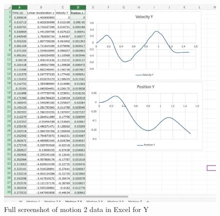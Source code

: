 \documentclass[idxtotoc,hyperref,openany]{labbook} %
\begin{document}
\begin{figure}[H] %
\begin{center}
\includegraphics[width=1.2\linewidth]{images/Lab.03/Lab03MotionYExcel.png}
\end{center}
\caption{Full screenshot of motion 2 data in Excel for Y}
\label{fig:Lab03-Motion2-Excel-Y}
\end{figure}
\end{document}
